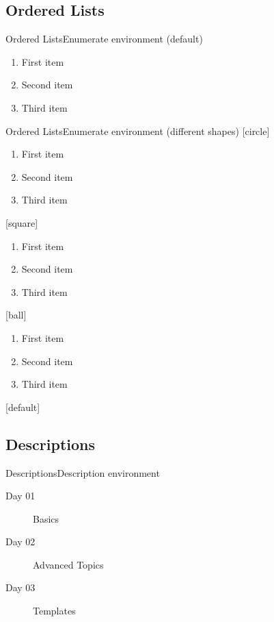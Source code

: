 \documentclass{beamer}
\begin{document}
    \subsection{Ordered Lists}

    \begin{frame}{Ordered Lists}{Enumerate environment (default)}
    \begin{enumerate}
        \item First item
        \item Second item
        \item Third item
    \end{enumerate}
    \end{frame}

    \begin{frame}{Ordered Lists}{Enumerate environment (different shapes)}
    [circle]
    \begin{enumerate}
        \item First item
        \item Second item
        \item Third item
    \end{enumerate}

    [square]
    \begin{enumerate}
        \item First item
        \item Second item
        \item Third item
    \end{enumerate}

    [ball]
    \begin{enumerate}
        \item First item
        \item Second item
        \item Third item
    \end{enumerate}

    [default] %

    \end{frame}

    \subsection{Descriptions}

    \begin{frame}{Descriptions}{Description environment}

    \begin{description}
        \item[Day 01] Basics
        \item[Day 02] Advanced Topics
        \item[Day 03] Templates
    \end{description}

    \end{frame}
\end{document}

